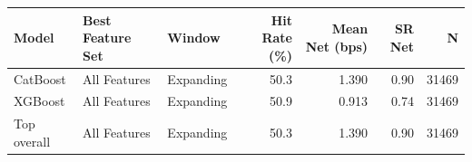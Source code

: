 \begin{tabular}{lllrrrr}
\toprule
Model & Best Feature Set & Window & Hit Rate (\%) & Mean Net (bps) & SR Net & N \\
\midrule
CatBoost & All Features & Expanding & 50.3 & 1.390 & 0.90 & 31469 \\
XGBoost & All Features & Expanding & 50.9 & 0.913 & 0.74 & 31469 \\
\midrule
Top overall & All Features & Expanding & 50.3 & 1.390 & 0.90 & 31469 \\
\bottomrule
\end{tabular}
